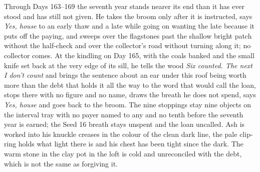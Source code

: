\documentclass{design/chronicle}
\begin{document}
{Through Days 163–169 the seventh year stands nearer its end than it has ever stood and has still not given. He takes the broom only after it is instructed, says \emph{Yes, house} to an early thaw and a late while going on wanting the late because it puts off the paying, and sweeps over the flagstones past the shallow bright patch without the half-check and over the collector’s road without turning along it; no collector comes. At the kindling on Day 165, with the coals banked and the small knife set back at the very edge of its sill, he tells the wood \emph{Six counted. The next I don’t count} and brings the sentence about an ear under this roof being worth more than the debt that holds it all the way to the word that would call the loan, stops there with no figure and no name, draws the breath he does not spend, says \emph{Yes, house} and goes back to the broom. The nine stoppings stay nine objects on the interval tray with no payer named to any and no tenth before the seventh year is earned; the Seed 16 breath stays unspent and the loan uncalled. Ash is worked into his knuckle creases in the colour of the clean dark line, the pale clip-ring holds what light there is and his chest has been tight since the dark. The warm stone in the clay pot in the loft is cold and unreconciled with the debt, which is not the same as forgiving it.

}
\end{document}
